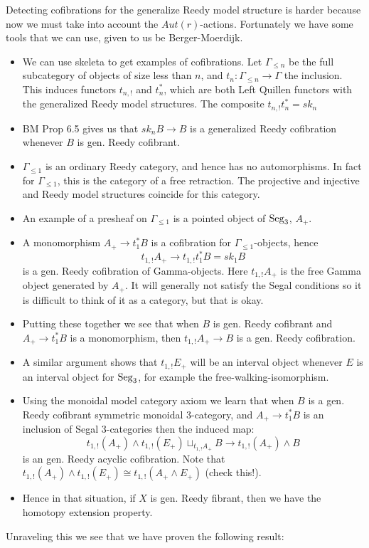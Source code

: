 \documentclass[a4paper]{amsart}
\begin{document}
Detecting cofibrations for the generalize Reedy model structure is harder because now we must take into account the $Aut(r)$-actions. Fortunately we have some tools that we can use, given to us be Berger-Moerdijk. 

\begin{itemize}
	\item We can use skeleta to get examples of cofibrations. Let $\Gamma_{\leq n}$ be the full subcategory of objects of size less than $n$, and $t_n: \Gamma_{\leq n} \to \Gamma$ the inclusion. This induces functors $t_{n, !}$ and $t_n^*$, which are both Left Quillen functors with the generalized Reedy model structures. The composite $t_{n, !} t^*_n = sk_n$
	\item BM Prop 6.5 gives us that $sk_n B \to B$ is a generalized Reedy cofibration whenever $B$ is gen. Reedy cofibrant. 
	\item $\Gamma_{\leq 1}$ is an ordinary Reedy category, and hence has no automorphisms. In fact for $\Gamma_{\leq 1}$, this is the category of a free retraction. The projective and injective and Reedy model structures coincide for this category. 
	\item An example of a presheaf on $\Gamma_{\leq 1}$ is a pointed object of $\mathrm{Seg}_3$, $A_+$. 
	\item A monomorphism $A_+ \to t_1^*B$ is a cofibration for $\Gamma_{\leq 1}$-objects, hence 
	\begin{equation*}
		t_{1,!} A_+ \to t_{1,!}t_1^*B = sk_1 B
	\end{equation*}
	is a gen. Reedy cofibration of Gamma-objects. Here $t_{1,!} A_+$ is the free Gamma object generated by $A_+$. It will generally not satisfy the Segal conditions so it is difficult to think of it as a category, but that is okay. 
	\item Putting these together we see that when $B$ is gen. Reedy cofibrant and $A_+ \to t_1^*B$ is a monomorphism, then $t_{1,!} A_+ \to B$ is a gen. Reedy cofibration. 
	\item A similar argument shows that $t_{1,!} E_+$ will be an interval object whenever $E$ is an interval object for $\mathrm{Seg}_3$, for example the free-walking-isomorphism. 
	\item Using the monoidal model category axiom we learn that when $B$ is a gen. Reedy cofibrant symmetric monoidal 3-category, and $A_+ \to t^*_1 B$ is an inclusion of Segal 3-categories then the induced map:
	\begin{equation*}
		t_{1,!}(A_+) \wedge t_{1,!}(E_+) \sqcup_{t_{1,!}A_+} B  \to t_{1,!}(A_+) \wedge B
	\end{equation*}
	is an gen. Reedy acyclic cofibration. Note that $t_{1,!}(A_+) \wedge t_{1,!}(E_+) \cong  t_{1,!}(A_+ \wedge E_+)$ (check this!).
	\item Hence in that situation, if $X$ is gen. Reedy fibrant, then we have the homotopy extension property.
\end{itemize}
Unraveling this we see that we have proven the following result:
\end{document}
